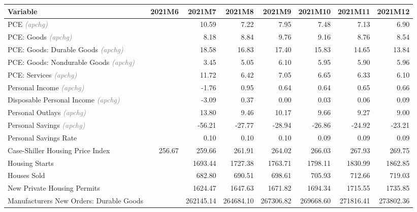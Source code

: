 \documentclass[11pt, letterpaper]{article}\usepackage[]{graphicx}\usepackage[]{color}
\begin{document}
\begin{table}[H]
\centering
\begingroup\fontsize{10pt}{12pt}\selectfont
\begin{tabular}{lrrrrrrr}
  \hline
Variable & 2021M6 & 2021M7 & 2021M8 & 2021M9 & 2021M10 & 2021M11 & 2021M12 \\ 
  \hline
PCE \textit{\footnotesize\textcolor{gray}{(apchg)}} &  & 10.59 & 7.22 & 7.95 & 7.48 & 7.13 & 6.90 \\ 
  PCE: Goods \textit{\footnotesize\textcolor{gray}{(apchg)}} &  & 8.18 & 8.84 & 9.76 & 9.16 & 8.76 & 8.54 \\ 
  PCE: Goods: Durable Goods \textit{\footnotesize\textcolor{gray}{(apchg)}} &  & 18.58 & 16.83 & 17.40 & 15.83 & 14.65 & 13.84 \\ 
  PCE: Goods: Nondurable Goods \textit{\footnotesize\textcolor{gray}{(apchg)}} &  & 3.45 & 5.05 & 6.10 & 5.95 & 5.90 & 5.96 \\ 
  PCE: Services \textit{\footnotesize\textcolor{gray}{(apchg)}} &  & 11.72 & 6.42 & 7.05 & 6.65 & 6.33 & 6.10 \\ 
  Personal Income \textit{\footnotesize\textcolor{gray}{(apchg)}} &  & -1.76 & 0.95 & 0.64 & 0.64 & 0.65 & 0.66 \\ 
  Disposable Personal Income \textit{\footnotesize\textcolor{gray}{(apchg)}} &  & -3.09 & 0.37 & 0.00 & 0.03 & 0.06 & 0.09 \\ 
  Personal Outlays \textit{\footnotesize\textcolor{gray}{(apchg)}} &  & 13.80 & 9.46 & 10.17 & 9.66 & 9.27 & 9.00 \\ 
  Personal Savings \textit{\footnotesize\textcolor{gray}{(apchg)}} &  & -56.21 & -27.77 & -28.94 & -26.86 & -24.92 & -23.21 \\ 
  Personal Savings Rate &  & 0.10 & 0.10 & 0.10 & 0.09 & 0.09 & 0.09 \\ 
  Case-Shiller Housing Price Index & 256.67 & 259.66 & 261.91 & 264.02 & 266.03 & 267.93 & 269.75 \\ 
  Housing Starts &  & 1693.44 & 1727.38 & 1763.71 & 1798.11 & 1830.99 & 1862.85 \\ 
  Houses Sold &  & 682.80 & 690.51 & 698.61 & 705.93 & 712.66 & 719.03 \\ 
  New Private Housing Permits &  & 1624.47 & 1647.63 & 1671.82 & 1694.34 & 1715.55 & 1735.85 \\ 
  Manufacturers New Orders: Durable Goods &  & 262145.14 & 264684.10 & 267306.82 & 269668.60 & 271816.41 & 273802.36 \\ 

\end{tabular}
\end{table}
\end{document}
